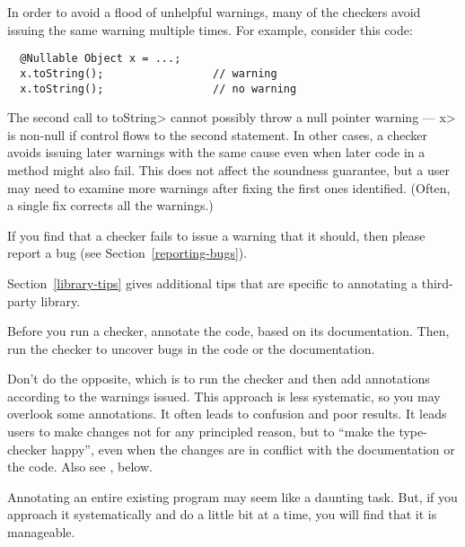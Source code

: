 In order to avoid a flood of unhelpful warnings, many of the checkers avoid
issuing the same warning multiple times.  For example, consider this code:

\begin{Verbatim}
  @Nullable Object x = ...;
  x.toString();                 // warning
  x.toString();                 // no warning
\end{Verbatim}

\noindent
The second call to \<toString> cannot possibly throw a null
pointer warning --- \<x> is non-null if control flows to the second
statement.
In other cases, a checker avoids issuing later warnings with the same cause
even when later code in a method might also fail.
This does not
affect the soundness guarantee, but a user may need to examine more
warnings after fixing the first ones identified.  (Often,
a single fix corrects all the warnings.)


If you find that a checker fails to issue a warning that it
should, then please report a bug (see Section~\ref{reporting-bugs}).



Section~\ref{library-tips} gives additional tips that are
specific to annotating a third-party library.



Before you run a checker, annotate the code, based on its documentation.
Then, run the checker to uncover bugs in the code or the documentation.

Don't do the opposite, which is to run the checker and then add annotations
according to the warnings issued.  This approach is less systematic, so you
may overlook some annotations.  It often leads to confusion and poor
results.  It leads users to make changes not for any principled reason, but
to ``make the type-checker happy'', even when the changes are in conflict
with the documentation or the code.  Also see
, below.



Annotating an entire existing program may seem like a daunting task.  But,
if you approach it systematically and do a little bit at a time, you will
find that it is manageable.

